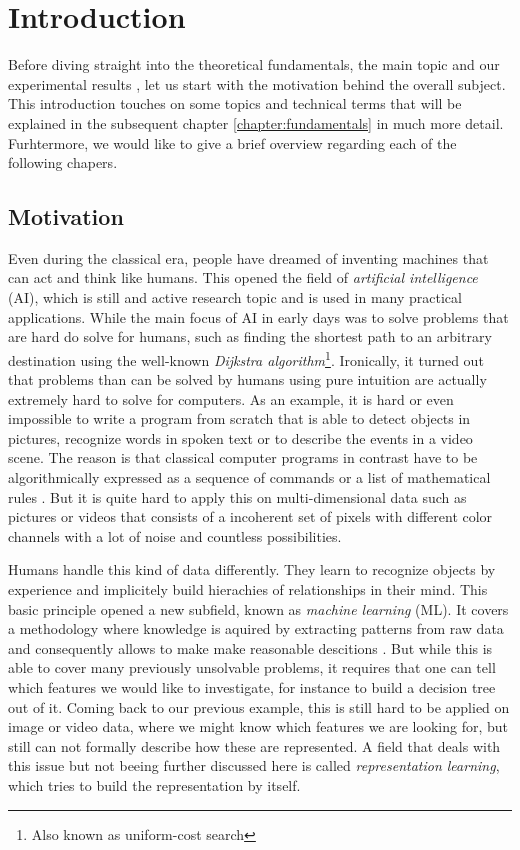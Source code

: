 

\chapter{Introduction} \label{chapter:introduction}

Before diving straight into the theoretical fundamentals, the main topic and  our experimental results , let us start with the motivation behind the overall subject. This introduction touches on some topics and technical terms that will be explained in the subsequent chapter \ref{chapter:fundamentals} in much more detail. Furhtermore, we would like to give a brief overview regarding each of the following chapers.

\section{Motivation}

Even during the classical era, people have dreamed of inventing machines that can act and think like humans. This opened the field of \textit{artificial intelligence} (AI), which is still and active research topic and is used in many practical applications. While the main focus of AI in early days was to solve problems that are hard do solve for humans, such as finding the shortest path to an arbitrary destination using the well-known \textit{Dijkstra algorithm}\footnote{Also known as uniform-cost search}. Ironically, it turned out that problems than can be solved by humans using pure intuition are actually extremely hard to solve for computers. As an example, it is hard or even impossible to write a program from scratch that is able to detect objects in pictures, recognize words in spoken text or to describe the events in a video scene. The reason is that classical computer programs in contrast have to be algorithmically expressed as a sequence of commands or a list of mathematical rules \parencite{deep_learning}. But it is quite hard to apply this on multi-dimensional data such as pictures or videos that consists of a incoherent set of pixels with different color channels with a lot of noise and countless possibilities. 

Humans handle this kind of data differently. They learn to recognize objects by experience and implicitely build hierachies of relationships in their mind. This basic principle opened a new subfield, known as \textit{machine learning} (ML). It covers a methodology where knowledge is aquired by extracting patterns from raw data and consequently allows to make make reasonable descitions \parencite{deep_learning}. But while this is able to cover many previously unsolvable problems, it requires that one can tell which features we would like to investigate, for instance to build a decision tree out of it. Coming back to our previous example, this is still hard to be applied on image or video data, where we might know which features we are looking for, but still can not formally describe how these are represented. A field that deals with this issue but not beeing further discussed here is called \textit{representation learning}, which tries to build the representation by itself.

